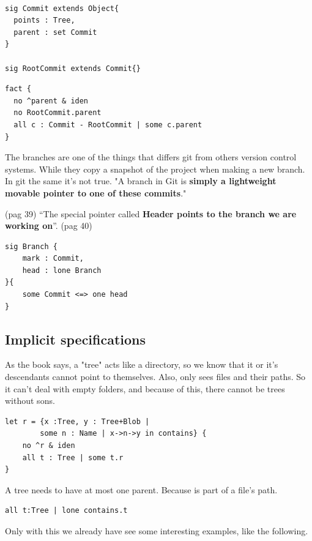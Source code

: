 \begin{lstlisting}

sig Commit extends Object{
  points : Tree,
  parent : set Commit
}

sig RootCommit extends Commit{}

\end{lstlisting}

\begin{lstlisting}
fact {
  no ^parent & iden
  no RootCommit.parent
  all c : Commit - RootCommit | some c.parent	
}

\end{lstlisting}

The branches are one of the things that differs git from 
others version control systems. While they copy a snapshot of the 
project when making a new branch. In git the same it's not true.
"A branch in Git is {\bf simply a 
lightweight movable pointer to one of these commits}." \par \cite{progit} 
(pag 39)
``The special pointer called {\bf Header 
points to the branch we are working on}''. \cite{progit} (pag 40)

\begin{lstlisting}
sig Branch {
	mark : Commit,
	head : lone Branch
}{
	some Commit <=> one head
}
\end{lstlisting}


\subsection{Implicit specifications}

As the book \cite{gitComm} says, a "tree" acts
like a directory, so we know that it or it's 
descendants cannot point to themselves.
Also, only sees files and their paths. So it can't
deal with empty folders, and because of this, there cannot
be trees without sons.
\begin{lstlisting}
let r = {x :Tree, y : Tree+Blob | 
		some n : Name | x->n->y in contains} {
	no ^r & iden
	all t : Tree | some t.r
}
\end{lstlisting}

A tree needs to have at most one parent. Because is part
of a file's path.
\begin{lstlisting}
all t:Tree | lone contains.t
\end{lstlisting} \par

Only with this we already have see some interesting examples, like
the following.\par

